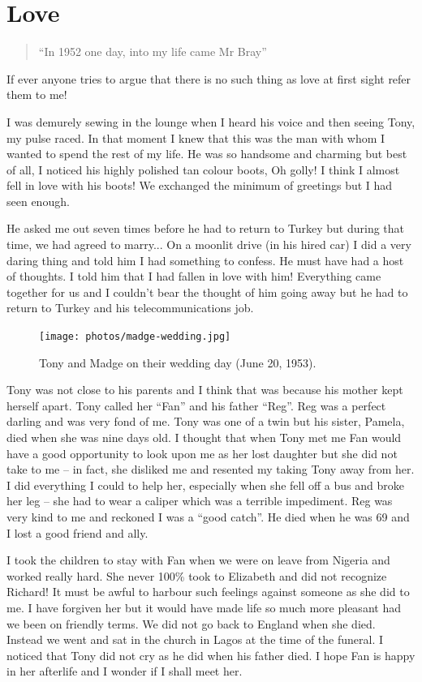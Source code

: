 \chapter{Love}

\begin{verse}
``In 1952 one day, into my life came Mr Bray''
\end{verse}

If ever anyone tries to argue that there is no such thing as love at
first sight refer them to me!

I was demurely sewing in the lounge when I heard his voice and then
seeing Tony, my pulse raced. In that moment I knew that this was the
man with whom I wanted to spend the rest of my life. He was so
handsome and charming but best of all, I noticed his highly polished
tan colour boots, Oh golly! I think I almost fell in love with his
boots! We exchanged the minimum of greetings but I had seen enough.

He asked me out seven times before he had to return to Turkey but
during that time, we had agreed to marry... On a moonlit drive (in his
hired car) I did a very daring thing and told him I had something to
confess. He must have had a host of thoughts. I told him that I had
fallen in love with him! Everything came together for us and I
couldn't bear the thought of him going away but he had to return to
Turkey and his telecommunications job.

\begin{figure}
  \centering
  \texttt{[image: photos/madge-wedding.jpg]}
  \caption{Tony and Madge on their wedding day (June 20, 1953).}
  \label{madge-wedding}
\end{figure}

Tony was not close to his parents and I think that was because his
mother kept herself apart. Tony called her ``Fan'' and his father
``Reg''. Reg was a perfect darling and was very fond of me. Tony was
one of a twin but his sister, Pamela, died when she was nine days
old. I thought that when Tony met me Fan would have a good opportunity
to look upon me as her lost daughter but she did not take to me -- in
fact, she disliked me and resented my taking Tony away from her. I did
everything I could to help her, especially when she fell off a bus and
broke her leg -- she had to wear a caliper which was a terrible
impediment. Reg was very kind to me and reckoned I was a ``good
catch''. He died when he was 69 and I lost a good friend and ally.

I took the children to stay with Fan when we were on leave from
Nigeria and worked really hard. She never 100\% took to Elizabeth and
did not recognize Richard! It must be awful to harbour such feelings
against someone as she did to me. I have forgiven her but it would
have made life so much more pleasant had we been on friendly terms. We
did not go back to England when she died. Instead we went and sat in
the church in Lagos at the time of the funeral. I noticed that Tony
did not cry as he did when his father died. I hope Fan is happy in her
afterlife and I wonder if I shall meet her.

